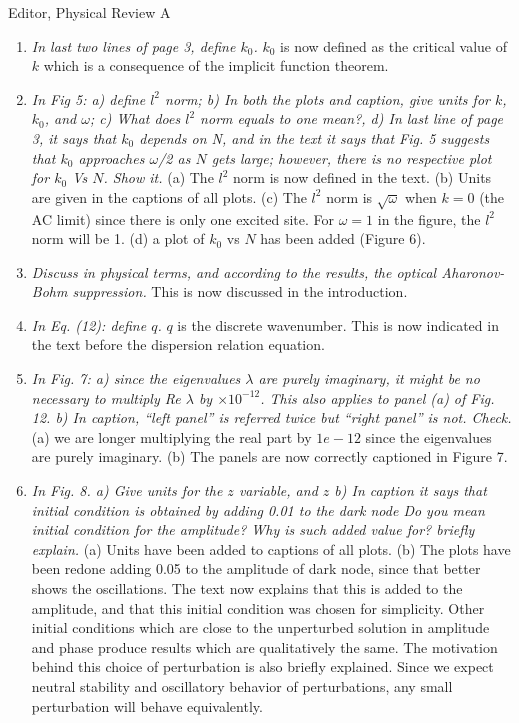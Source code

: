 \documentclass[11pt]{letter}
\begin{document}
\begin{letter}{Editor, Physical Review A}
\begin{enumerate}
\item \emph{In last two lines of page 3, define $k_0$.} $k_0$ is now defined as the critical value of $k$ which is a consequence of the implicit function theorem.

\item \emph{In Fig 5: a) define $l^2$ norm; b) In both the plots and caption, give units for $k$, $k_0$, and $\omega$; c) What does $l^2$ norm equals to one mean?, d) In last line of page 3, it says that $k_0$ depends on N, and in the text it says that Fig. 5 suggests that $k_0$ approaches $\omega$/2 as $N$ gets large; however, there is no respective plot for $k_0$ Vs $N$. Show it.} (a) The $l^2$ norm is now defined in the text. (b) Units are given in the captions of all plots. (c) The $l^2$ norm is $\sqrt{\omega}$ when $k = 0$ (the AC limit) since there is only one excited site. For $\omega = 1$ in the figure, the $l^2$ norm will be 1. (d) a plot of $k_0$ vs $N$ has been added (Figure 6).

\item \emph{Discuss in physical terms, and according to the results, the optical Aharonov-Bohm suppression.} This is now discussed in the introduction.

\item \emph{In Eq. (12): define $q$.} $q$ is the discrete wavenumber. This is now indicated in the text before the dispersion relation equation.

\item \emph{In Fig. 7: a) since the eigenvalues $\lambda$ are purely imaginary, it might be no necessary to multiply Re $\lambda$ by $\times10^{-12}$. This also applies to panel (a) of Fig. 12. b) In caption, ``left panel'' is referred twice but ``right panel'' is not. Check.} (a) we are longer multiplying the real part by $1e-12$ since the eigenvalues are purely imaginary. (b) The panels are now correctly captioned in Figure 7.

\item \emph{In Fig. 8. a) Give units for the $z$ variable, and $z$ b) In caption it says that initial condition is obtained by adding 0.01 to the dark node Do you mean initial condition for the amplitude? Why is such added value for? briefly explain.} (a) Units have been added to captions of all plots. (b) The plots have been redone adding 0.05 to the amplitude of dark node, since that better shows the oscillations. The text now explains that this is added to the amplitude, and that this initial condition was chosen for simplicity. Other initial conditions which are close to the unperturbed solution in amplitude and phase produce results which are qualitatively the same. The motivation behind this choice of perturbation is also briefly explained. Since we expect neutral stability and oscillatory behavior of perturbations, any small perturbation will behave equivalently.


\end{enumerate}
\end{letter}
\end{document}
